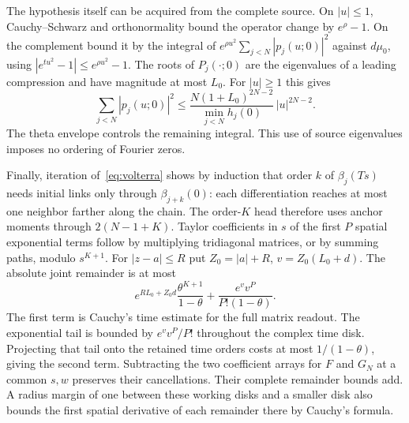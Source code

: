The hypothesis itself can be acquired from the complete source. On \(|u|\le1\), Cauchy--Schwarz and orthonormality bound the operator change by \(e^\rho-1\). On the complement bound it by the integral of \(e^{\rho u^2}\sum_{j<N}|p_j(u;0)|^2\) against \(d\mu_0\), using \(|e^{tu^2}-1|\le e^{\rho u^2}-1\). The roots of \(P_j(\cdot;0)\) are the eigenvalues of a leading compression and have magnitude at most \(L_0\). For \(|u|\ge1\) this gives
\[
 \sum_{j<N}|p_j(u;0)|^2\le
 \frac{N(1+L_0)^{2N-2}}{\min_{j<N}h_j(0)}\,|u|^{2N-2}.
\]
The theta envelope controls the remaining integral. This use of source eigenvalues imposes no ordering of Fourier zeros.

Finally, iteration of~\eqref{eq:volterra} shows by induction that order \(k\) of \(\beta_j(Ts)\) needs initial links only through \(\beta_{j+k}(0)\): each differentiation reaches at most one neighbor farther along the chain. The order-\(K\) head therefore uses anchor moments through \(2(N-1+K)\). Taylor coefficients in \(s\) of the first \(P\) spatial exponential terms follow by multiplying tridiagonal matrices, or by summing paths, modulo \(s^{K+1}\). For \(|z-a|\le R\) put \(Z_0=|a|+R\), \(v=Z_0(L_0+d)\). The absolute joint remainder is at most
\begin{equation}
 e^{RL_0+Z_0d}\frac{\theta^{K+1}}{1-\theta}
       +\frac{e^{v}v^P}{P!(1-\theta)} .
 \label{eq:head-tail}
\end{equation}
The first term is Cauchy's time estimate for the full matrix readout. The exponential tail is bounded by \(e^vv^P/P!\) throughout the complex time disk. Projecting that tail onto the retained time orders costs at most \(1/(1-\theta)\), giving the second term. Subtracting the two coefficient arrays for \(F\) and \(G_N\) at a common \(s,w\) preserves their cancellations. Their complete remainder bounds add. A radius margin of one between these working disks and a smaller disk also bounds the first spatial derivative of each remainder there by Cauchy's formula.
